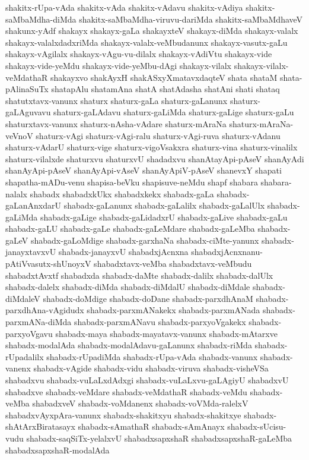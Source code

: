 {shakitx-rUpa-vAda
shakitx-vAda
shakitx-vAdavu
shakitx-vAdiya
shakitx-saMbaMdha-diMda
shakitx-saMbaMdha-viruvu-dariMda
shakitx-saMbaMdhaveV
shakunx-yAdf
shakayx
shakayx-gaLa
shakayxteV
shakayx-diMda
shakayx-valalx
shakayx-valalxdadxriMda
shakayx-valalx-veMbudanunx
shakayx-vasutx-gaLu
shakayx-vAgilalx
shakayx-vAgu-vu-dilalx
shakayx-vAdiVtu
shakayx-vide
shakayx-vide-yeMdu
shakayx-vide-yeMbu-dAgi
shakayx-vilalx
shakayx-vilalx-veMdathaR
shakayxvo
shakAyxH
shakASxyXmatavxdaqteV
shata
shataM
shata-pAlinaSuTx
shatapAlu
shatamAna
shatA
shatAdasha
shatAni
shati
shataq
shatutxtavx-vanunx
shaturx
shaturx-gaLa
shaturx-gaLanunx
shaturx-gaLAguvavu
shaturx-gaLAdavu
shaturx-gaLiMda
shaturx-gaLige
shaturx-gaLu
shaturxtavx-vanunx
shaturx-nAsha-vAdare
shaturx-mAraNa
shaturx-mAraNa-veVnoV
shaturx-vAgi
shaturx-vAgi-ralu
shaturx-vAgi-ruva
shaturx-vAdanu
shaturx-vAdarU
shaturx-vige
shaturx-vigoVsakxra
shaturx-vina
shaturx-vinalilx
shaturx-vilalxde
shaturxvu
shaturxvU
shadadxvu
shanAtayApi-pAseV
shanAyAdi
shanAyApi-pAseV
shanAyApi-vAseV
shanAyApiV-pAseV
shanevxY
shapati
shapatha-mADu-venu
shapisa-beVku
shapisuve-neMdu
shapf
shabara
shabara-nalalx
shabadx
shabadxkUkx
shabadxkekx
shabadx-gaLa
shabadx-gaLanAnxdarU
shabadx-gaLanunx
shabadx-gaLalilx
shabadx-gaLalUlx
shabadx-gaLiMda
shabadx-gaLige
shabadx-gaLidadxrU
shabadx-gaLive
shabadx-gaLu
shabadx-gaLU
shabadx-gaLe
shabadx-gaLeMdare
shabadx-gaLeMba
shabadx-gaLeV
shabadx-gaLoMdige
shabadx-garxhaNa
shabadx-ciMte-yanunx
shabadx-janayxtavxvU
shabadx-janayxvU
shabadxjAcnxna
shabadxjAcnxnanu-pAtiVvasutx-shUnoyxV
shabadxtavx-veMba
shabadxtavx-veMbudu
shabadxtAvxtf
shabadxda
shabadx-daMte
shabadx-dalilx
shabadx-dalUlx
shabadx-dalelx
shabadx-diMda
shabadx-diMdalU
shabadx-diMdale
shabadx-diMdaleV
shabadx-doMdige
shabadx-doDane
shabadx-parxdhAnaM
shabadx-parxdhAna-vAgidudx
shabadx-parxmANakekx
shabadx-parxmANada
shabadx-parxmANa-diMda
shabadx-parxmANavu
shabadx-parxyoVgakekx
shabadx-parxyoVgavu
shabadx-maya
shabadx-mayatavx-vanunx
shabadx-mAtarxve
shabadx-modalAda
shabadx-modalAdavu-gaLanunx
shabadx-riMda
shabadx-rUpadalilx
shabadx-rUpadiMda
shabadx-rUpa-vAda
shabadx-vanunx
shabadx-vanenx
shabadx-vAgide
shabadx-vidu
shabadx-viruva
shabadx-visheVSa
shabadxvu
shabadx-vuLaLxdAdxgi
shabadx-vuLaLxvu-gaLAgiyU
shabadxvU
shabadxve
shabadx-veMdare
shabadx-veMdathaR
shabadx-veMdu
shabadx-veMba
shabadxveV
shabadx-voMdanenx
shabadx-voVMda-ralelxV
shabadxvAyxpAra-vanunx
shabadx-shakitxyu
shabadx-shakitxye
shabadx-shAtArxBiratasayx
shabadx-sAmathaR
shabadx-sAmAnayx
shabadx-sUcisu-vudu
shabadx-saqSiTx-yelalxvU
shabadxsapxshaR
shabadxsapxshaR-gaLeMba
shabadxsapxshaR-modalAda
}
